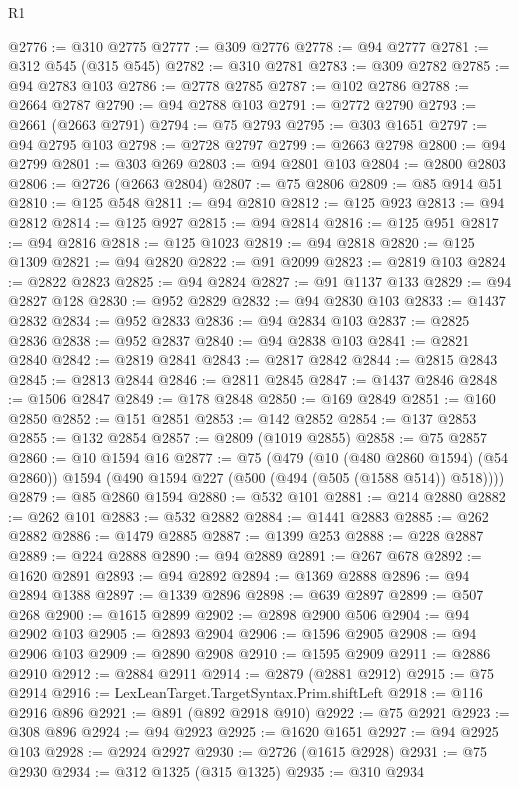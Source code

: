\begin{lexlean}{R1}
\begin{coremodule}
@2776 := @310 @2775
@2777 := @309 @2776
@2778 := @94 @2777
@2781 := @312 @545 (@315 @545)
@2782 := @310 @2781
@2783 := @309 @2782
@2785 := @94 @2783 @103
@2786 := @2778 @2785
@2787 := @102 @2786
@2788 := @2664 @2787
@2790 := @94 @2788 @103
@2791 := @2772 @2790
@2793 := @2661 (@2663 @2791)
@2794 := @75 @2793
@2795 := @303 @1651
@2797 := @94 @2795 @103
@2798 := @2728 @2797
@2799 := @2663 @2798
@2800 := @94 @2799
@2801 := @303 @269
@2803 := @94 @2801 @103
@2804 := @2800 @2803
@2806 := @2726 (@2663 @2804)
@2807 := @75 @2806
@2809 := @85 @914 @51
@2810 := @125 @548
@2811 := @94 @2810
@2812 := @125 @923
@2813 := @94 @2812
@2814 := @125 @927
@2815 := @94 @2814
@2816 := @125 @951
@2817 := @94 @2816
@2818 := @125 @1023
@2819 := @94 @2818
@2820 := @125 @1309
@2821 := @94 @2820
@2822 := @91 @2099
@2823 := @2819 @103
@2824 := @2822 @2823
@2825 := @94 @2824
@2827 := @91 @1137 @133
@2829 := @94 @2827 @128
@2830 := @952 @2829
@2832 := @94 @2830 @103
@2833 := @1437 @2832
@2834 := @952 @2833
@2836 := @94 @2834 @103
@2837 := @2825 @2836
@2838 := @952 @2837
@2840 := @94 @2838 @103
@2841 := @2821 @2840
@2842 := @2819 @2841
@2843 := @2817 @2842
@2844 := @2815 @2843
@2845 := @2813 @2844
@2846 := @2811 @2845
@2847 := @1437 @2846
@2848 := @1506 @2847
@2849 := @178 @2848
@2850 := @169 @2849
@2851 := @160 @2850
@2852 := @151 @2851
@2853 := @142 @2852
@2854 := @137 @2853
@2855 := @132 @2854
@2857 := @2809 (@1019 @2855)
@2858 := @75 @2857
@2860 := @10 @1594 @16
@2877 := @75
    (@479
      (@10 (@480 @2860 @1594) (@54 @2860))
      @1594
      (@490 @1594 @227 (@500 (@494 (@505 (@1588 @514)) @518))))
@2879 := @85 @2860 @1594
@2880 := @532 @101
@2881 := @214 @2880
@2882 := @262 @101
@2883 := @532 @2882
@2884 := @1441 @2883
@2885 := @262 @2882
@2886 := @1479 @2885
@2887 := @1399 @253
@2888 := @228 @2887
@2889 := @224 @2888
@2890 := @94 @2889
@2891 := @267 @678
@2892 := @1620 @2891
@2893 := @94 @2892
@2894 := @1369 @2888
@2896 := @94 @2894 @1388
@2897 := @1339 @2896
@2898 := @639 @2897
@2899 := @507 @268
@2900 := @1615 @2899
@2902 := @2898 @2900 @506
@2904 := @94 @2902 @103
@2905 := @2893 @2904
@2906 := @1596 @2905
@2908 := @94 @2906 @103
@2909 := @2890 @2908
@2910 := @1595 @2909
@2911 := @2886 @2910
@2912 := @2884 @2911
@2914 := @2879 (@2881 @2912)
@2915 := @75 @2914
@2916 := LexLeanTarget.TargetSyntax.Prim.shiftLeft
@2918 := @116 @2916 @896
@2921 := @891 (@892 @2918 @910)
@2922 := @75 @2921
@2923 := @308 @896
@2924 := @94 @2923
@2925 := @1620 @1651
@2927 := @94 @2925 @103
@2928 := @2924 @2927
@2930 := @2726 (@1615 @2928)
@2931 := @75 @2930
@2934 := @312 @1325 (@315 @1325)
@2935 := @310 @2934

\end{coremodule}
\end{lexlean}
